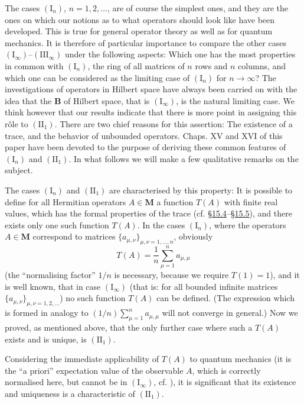 \documentclass[12pt,b5paper,twoside]{article}
\newcommand{\M}{\mathbf M}
\newcommand{\B}{\mathbf B}
\newcommand{\secref}[1]{\hyperref[sec:#1]{\S#1}}
\begin{document}
The cases $(\mathrm I_n)$, $n=1,2,\ldots$, are of course the simplest ones, and
they are the ones on which our notions as to what operators should look like
have been developed. This is true for general operator theory as well as for
quantum mechanics. It is therefore of particular importance to compare the
other cases $(\mathrm I_\infty)$--$(\mathrm{III}_\infty)$ under the following
aspects: Which one has the most properties in common with $(\mathrm I_n)$, the
ring of all matrices of $n$ rows and $n$ columns, and which one can be
considered as the limiting case of $(\mathrm I_n)$ for $n\to\infty$? The
investigations of operators in Hilbert space have always been carried on with
the idea that the $\B$ of Hilbert space, that is $(\mathrm I_\infty)$, is the
natural limiting case. We think however that our results indicate that there is
more point in assigning this r\^ole to $(\mathrm{II}_1)$. There are two chief
reasons for this assertion: The existence of a trace, and the behavior of
unbounded operators. Chaps. XV and XVI of this paper have been devoted to
the purpose of deriving these common features of $(\mathrm I_n)$ and
$(\mathrm{II}_1)$. In what follows we will make a few qualitative remarks on
the subject.

The cases $(\mathrm I_n)$ and $(\mathrm{II}_1)$ are characterised by this
property: It is possible to define for all Hermitian operators $A\in\M$ a
function $T(A)$ with finite real values, which has the formal properties of the
trace (cf. \secref{15.4}--\secref{15.5}), and there exists only one such function
$T(A)$. In the cases $(\mathrm I_n)$, where the operators $A\in\M$ correspond
to matrices $\{a_{\mu,\nu}\}_{\mu,\nu=1,\ldots,n}$, obviously
\[
 T(A)=\frac1n\sum_{\mu=1}^n a_{\mu,\mu}
\]
(the ``normalising factor'' $1/n$ is necessary, because we require $T(1)=1$),
and it is well known, that in case $(\mathrm I_\infty)$ (that is: for all bounded
infinite matrices $\{a_{\mu,\nu}\}_{\mu,\nu=1,2,\ldots}$) no such function
$T(A)$ can be defined. (The expression which is formed in analogy to
$(1/n)\sum_{\mu=1}^n a_{\mu,\mu}$ will not converge in general.) Now we
proved, as mentioned above, that the only further case where such a $T(A)$
exists and is unique, is $(\mathrm{II}_1)$.

Considering the immediate applicability of $T(A)$ to quantum mechanics (it
is the ``a priori'' expectation value of the observable $A$, which is correctly
normalised here, but cannot be in $(\mathrm I_\infty)$,
cf. \cite[pp.~165, 169]{ref20}), it is significant that its existence and
uniqueness is a characteristic of $(\mathrm{II}_1)$.
\end{document}
